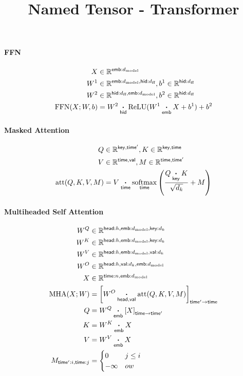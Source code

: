 \documentclass{article}
\title{Named Tensor - Transformer}
\date{}
\DeclareMathOperator*{\softmax}{softmax}
\newcommand{\reals}[0]{\mathbb{R}}
\newcommand{\name}[1]{\mathsf{#1}}
\newcommand{\ndot}[1]{\mathbin{\mathop{\thinspace\boldsymbol\cdot\thinspace}\limits_{\name{#1}}}}
\newcommand{\nfun}[2]{\underset{\name{#1}}{#2}}
\newcommand{\dmodel}{d_{\text{model}}}
\newcommand{\dff}{d_{\text{ff}}}
\begin{document}
\maketitle
\vspace{-2cm}


\paragraph{FFN}
\begin{align*}
X &\in \reals^{\name{emb}:\dmodel} \\
W^1 &\in \reals^{\name{emb}:\dmodel, \name{hid}:\dff }, 
b^1 \in \reals^{\name{hid}:\dff} \\
W^2 & \in \reals^{ \name{hid}:\dff, \name{emb}:\dmodel}, b^2 \in \reals^{\name{hid}:\dff} \\
\text{FFN}(X; W, b) &=  W^2 \ndot{hid} \text{ReLU}(W^1 \ndot{emb} X + b^1) + b^2
\end{align*}

\paragraph{Masked Attention}
\begin{align*} 
Q &\in \reals^{\name{key}, \name{time'}},  K \in \reals^{\name{key}, \name{time}}\\
V &\in \reals^{\name{time}, \name{val}},
M \in \reals^{\name{time}, \name{time'}}\\
\text{att}(Q, K, V, M) &=  V \ndot{time} \nfun{time}{\softmax} \left( \frac{\displaystyle Q \ndot{key} K }{\sqrt{d_k}} + M\right) 
\end{align*}

\paragraph{Multiheaded Self Attention}
\begin{align*}
 W^Q &\in \mathbb{R}^{\name{head}:h, \name{emb}:\dmodel, \name{key}:d_k} \\
  W^K &\in \mathbb{R}^{\name{head}:h, \name{emb}:\dmodel, \name{key}:d_k} \\
   W^V &\in \mathbb{R}^{\name{head}:h, \name{emb}:\dmodel, \name{val}:d_k} \\
  W^O &\in \mathbb{R}^{\name{head}:h, \name{val}:d_k, \name{emb}:\dmodel} \\
  X &\in \mathbb{R}^{\name{time}:n, \name{emb}:\dmodel} \\
  \text{MHA}(X; W) &= \left[W^O \ndot{head,val} \text{att}(Q, K, V, M) \right]_{\name{time'} \rightarrow \name{time}} \\
  Q &= W^Q \ndot{emb} \left[X\right]_{\name{time}\rightarrow\name{time'}} \\
  K &= W^K \ndot{emb} X \\
  V &= W^V \ndot{emb} X \\
 M_{\name{time'}:i, \name{time}:j} &= \begin{cases} 0 & j\leq i \\ -\infty & ow \end{cases}   
\end{align*}
\end{document}
